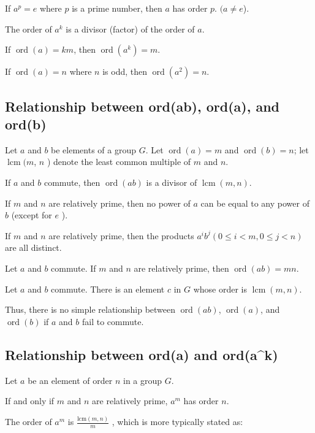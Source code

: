 \documentclass[11pt]{article}
\begin{document}
If \(a^p=e\) where \(p\) is a prime number, then \(a\) has order \(p\).
\((a \neq e\)).

The order of \(a^k\) is a divisor (factor) of the order of \(a\).

If \(\operatorname{ord}(a)=k m\), then
\(\operatorname{ord}\left(a^k\right)=m\).

If \(\operatorname{ord}(a)=n\) where \(n\) is odd, then
\(\operatorname{ord}\left(a^2\right)=n\).

\subsection{Relationship between ord(ab), ord(a), and
ord(b)}\label{relationship-between-ordab-orda-and-ordb}

Let \(a\) and \(b\) be elements of a group \(G\). Let
\(\operatorname{ord}(a)=m\) and \(\operatorname{ord}(b)=n\); let
\(\operatorname{lcm}(m\), \(n\) ) denote the least common multiple of
\(m\) and \(n\).

If \(a\) and \(b\) commute, then \(\operatorname{ord}(a b)\) is a
divisor of \(\operatorname{lcm}(m, n)\).

If \(m\) and \(n\) are relatively prime, then no power of \(a\) can be
equal to any power of \(b\) (except for \(e\) ).

If \(m\) and \(n\) are relatively prime, then the products
\(a^i b^j(0 \leq i<m, 0 \leq j<n)\) are all distinct.

Let \(a\) and \(b\) commute. If \(m\) and \(n\) are relatively prime,
then \(\operatorname{ord}(a b)=m n\).

Let \(a\) and \(b\) commute. There is an element \(c\) in \(G\) whose
order is \(\operatorname{lcm}(m, n)\).

Thus, there is no simple relationship between
\(\operatorname{ord}(a b)\), \(\operatorname{ord}(a)\), and
\(\operatorname{ord}(b)\) if \(a\) and \(b\) fail to commute.

\subsection{Relationship between ord(a) and
ord(a\^{}k)}\label{relationship-between-orda-and-ordak}
Let $a$ be an element of order $n$ in a group $G$.

If and only if $m$ and $n$ are relatively prime, $a^m$ has order $n$.

The order of $a^m$ is $\frac{\text{lcm}(m,n)}{m}$ , which is more typically stated as:
\end{document}
